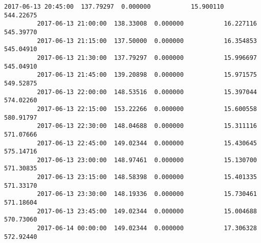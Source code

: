 \documentclass[11pt]{article}
\begin{document}
\begin{Verbatim}[commandchars=\\\{\}]
         2017-06-13 20:45:00  137.79297  0.000000           15.900110     544.22675   
         2017-06-13 21:00:00  138.33008  0.000000           16.227116     545.39770   
         2017-06-13 21:15:00  137.50000  0.000000           16.354853     545.04910   
         2017-06-13 21:30:00  137.79297  0.000000           15.996697     545.04910   
         2017-06-13 21:45:00  139.20898  0.000000           15.971575     549.52875   
         2017-06-13 22:00:00  148.53516  0.000000           15.397044     574.02260   
         2017-06-13 22:15:00  153.22266  0.000000           15.600558     580.91797   
         2017-06-13 22:30:00  148.04688  0.000000           15.311116     571.07666   
         2017-06-13 22:45:00  149.02344  0.000000           15.430645     575.14716   
         2017-06-13 23:00:00  148.97461  0.000000           15.130700     571.30835   
         2017-06-13 23:15:00  148.58398  0.000000           15.401335     571.33170   
         2017-06-13 23:30:00  148.19336  0.000000           15.730461     571.18604   
         2017-06-13 23:45:00  149.02344  0.000000           15.004688     570.73060   
         2017-06-14 00:00:00  149.02344  0.000000           17.306328     572.92440   
         

\end{Verbatim}
\end{document}
